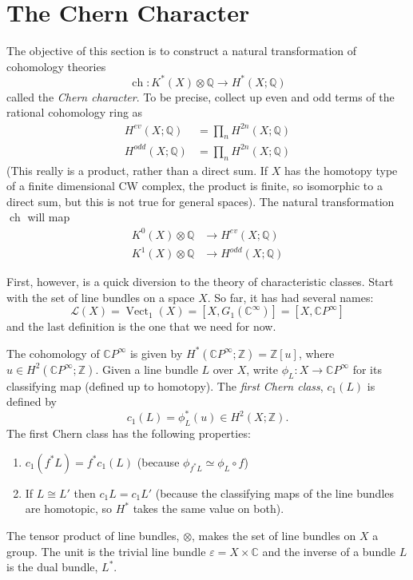 \documentclass[a4paper,10pt]{article}
\theoremstyle{plain}%
\theoremstyle{definition}
\theoremstyle{remark}
\newcommand{\ZZ}{\mathbb{Z}}
\newcommand{\CC}{\mathbb{C}}
\newcommand{\QQ}{\mathbb{Q}}
\newcommand{\cp}{\CC P}   %
\newcommand{\CPi}{\cp^\infty}
\DeclareMathOperator{\Vect}{Vect}
\renewcommand{\epsilon}{\varepsilon}
\DeclareMathOperator{\ch}{ch}
\begin{document}
\section{The Chern Character}

The objective of this section is to construct a natural transformation
of cohomology theories
\begin{equation*}
  \ch: K^*(X)\otimes \QQ \to H^*(X; \QQ)
\end{equation*}
called the \emph{Chern character}. To be precise, collect up even and
odd terms of the rational cohomology ring as
\begin{align*}
  H^{ev}(X; \QQ) &= \prod_n H^{2n}(X; \QQ)\\
  H^{odd}(X; \QQ) &= \prod_n H^{2n}(X; \QQ)
\end{align*}
(This really is a product, rather than a direct sum. If $X$ has the
homotopy type of a finite dimensional CW complex, the product is
finite, so isomorphic to a direct sum, but this is not true for
general spaces). The natural transformation $\ch$ will map
\begin{align*}
  K^0(X)\otimes \QQ &\to H^{ev}(X; \QQ)\\
  K^1(X)\otimes \QQ &\to H^{odd}(X; \QQ)
\end{align*}

First, however, is a quick diversion to the theory of characteristic
classes. Start with the set of line bundles on a space $X$. So far, it
has had several names:
\begin{equation*}
  \mathcal{L}(X) = \Vect_1(X) = [X, G_1(\CC^\infty)] = [X, \CPi]
\end{equation*}
and the last definition is the one that we need for now.

The cohomology of $\CPi$ is given by $H^*(\CPi; \ZZ) = \ZZ[u]$, where
$u\in H^2(\CPi;\ZZ)$. Given a line bundle $L$ over $X$, write $\phi_L:
X\to \CPi$ for its classifying map (defined up to homotopy). The
\emph{first Chern class}, $c_1(L)$ is defined by
\begin{equation}\label{eq:first-chern-class}
  c_1(L) = \phi_L^*(u) \in H^2(X; \ZZ).
\end{equation}
The first Chern class has the following properties:
\begin{enumerate}
\item $c_1(f^*L) = f^*c_1(L)$ (because $\phi_{f^*L} \simeq \phi_L
  \circ f$)

\item If $L \cong L'$ then $c_1L = c_1L'$ (because the classifying
  maps of the line bundles are homotopic, so $H^*$ takes the same
  value on both).
\end{enumerate}
The tensor product of line bundles, $\otimes$, makes the set of line
bundles on $X$ a group. The unit is the trivial line bundle $\epsilon
= X\times \CC$ and the inverse of a bundle $L$ is the dual bundle,
$L^*$.
\end{document}
